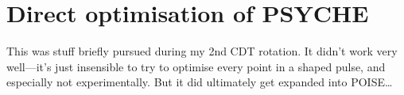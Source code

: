\section{Direct optimisation of PSYCHE}
\label{sec:pureshift__optimisation}

This was stuff briefly pursued during my 2nd CDT rotation.
It didn't work very well---it's just insensible to try to optimise every point in a shaped pulse, and especially not experimentally.
But it did ultimately get expanded into POISE\ldots
